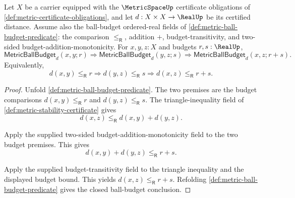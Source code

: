 \begin{theorem}
\label{thm:metric-ball-budget-composition}
Let $X$ be a carrier equipped with the $\MetricSpaceUp$ certificate obligations
of \autoref{def:metric-certificate-obligations}, and let
$d:X\times X\to\RealUp$ be its certified distance. Assume also the ball-budget
ordered-real fields of \autoref{def:metric-ball-budget-predicate}: the
comparison $\le_{\mathsf R}$, addition $+$, budget-transitivity, and two-sided
budget-addition-monotonicity. For $x,y,z:X$ and budgets $r,s:\RealUp$,
$$
\mathsf{MetricBallBudget}_d(x,y;r)\Longrightarrow
\mathsf{MetricBallBudget}_d(y,z;s)\Longrightarrow
\mathsf{MetricBallBudget}_d(x,z;r+s).
$$
Equivalently,
$$
d(x,y)\le_{\mathsf R} r\Longrightarrow d(y,z)\le_{\mathsf R} s\Longrightarrow d(x,z)\le_{\mathsf R} r+s.
$$
\end{theorem}
\begin{proof}
Unfold \autoref{def:metric-ball-budget-predicate}. The two premises are the
budget comparisons $d(x,y)\le_{\mathsf R} r$ and
$d(y,z)\le_{\mathsf R} s$. The triangle-inequality field of
\autoref{def:metric-stability-certificate} gives
$$
d(x,z)\le_{\mathsf R} d(x,y)+d(y,z).
$$

Apply the supplied two-sided budget-addition-monotonicity field to the two
budget premises. This gives
$$
d(x,y)+d(y,z)\le_{\mathsf R} r+s.
$$

Apply the supplied budget-transitivity field to the triangle inequality and
the displayed budget bound. This yields $d(x,z)\le_{\mathsf R} r+s$.
Refolding \autoref{def:metric-ball-budget-predicate} gives the closed
ball-budget conclusion.
\end{proof}

